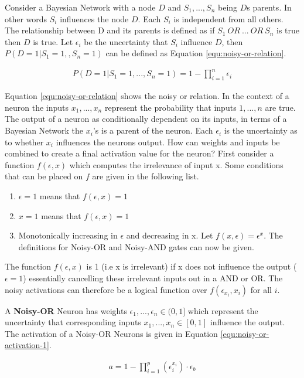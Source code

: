 Consider a Bayesian Network with a node $D$ and $S_1,..., S_n$ being $D$s parents. In other words $S_i$ influences the node $D$. Each $S_i$ is independent from all others. The relationship between D and its parents is defined as if $S_1\ OR\ ...\ OR\ S_n$ is true then $D$ is true. Let $\epsilon_i$ be the uncertainty that $S_i$ influence $D$, then $P(D = 1| S_1 = 1, , S_n = 1)$ can be defined as Equation \ref{equ:noisy-or-relation}.

\begin{align}
P(D = 1 | S_1 = 1, ..., S_n = 1) = 1 - \prod^n_{i=1} \epsilon_i
\label{equ:noisy-or-relation}
\end{align}

Equation \ref{equ:noisy-or-relation} shows the noisy or relation. In the context of a neuron the inputs $x_1, ..., x_n$ represent the probability that inputs $1, ..., n$ are true. The output of a neuron as conditionally dependent on its inputs, in terms of a Bayesian Network the $x_i$'s is a parent of the neuron. Each $\epsilon_i$ is the uncertainty as to whether $x_i$ influences the neurons output. How can weights and inputs be combined to create a final activation value for the neuron? First consider a function $f(\epsilon, x)$ which computes the irrelevance of input x. Some conditions \cite{LearningLogicalActivations} that can be placed on $f$ are given in the following list. 

\begin{enumerate}
	\item $\epsilon = 1$ means that $f(\epsilon, x) = 1$
	\item $x = 1$ means that $f(\epsilon, x) = 1$
	\item Monotonically increasing in $\epsilon$ and decreasing in x. Let $f(x, \epsilon) = \epsilon^x$. The definitions for Noisy-OR and Noisy-AND gates can now be given.
\end{enumerate}

The function $f(\epsilon, x)$ is 1 (i.e x is irrelevant) if x does not influence the output ($\epsilon = 1$) essentially cancelling these irrelevant inputs out in a AND or OR. The noisy activations can therefore be a logical function over $f(\epsilon_{x_i}, x_i)$ for all $i$.

\begin{definition}
	A \textbf{Noisy-OR} Neuron has weights $\epsilon_1, ..., \epsilon_n \in (0,1]$ which represent the uncertainty that corresponding inputs $x_1, ..., x_n \in [0,1]$ influence the output. The activation of a Noisy-OR Neurons is given in Equation \ref{equ:noisy-or-activation-1}.
	
	\begin{align}
	a = 1 - \prod^p_{i=1} (\epsilon_i^{x_i}) \cdot \epsilon_b
	\label{equ:noisy-or-activation-1}
	\end{align}
\end{definition}

